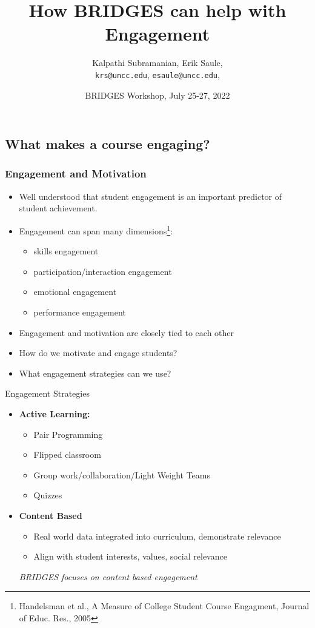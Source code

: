 \documentclass[aspectratio=169]{beamer}
\title{How BRIDGES can help with Engagement}
\subtitle{}
\author{Kalpathi Subramanian, Erik Saule, \\\texttt{krs@uncc.edu}, \texttt{esaule@uncc.edu}, }
\institute{$^1$The University of North Carolina at Charlotte}
\date{BRIDGES Workshop, July 25-27, 2022}
\begin{document}
\begin{frame}
\titlepage
\end{frame}




\subsection{What makes a course engaging?}

\begin{frame}
	\frametitle{Engagement and Motivation}
\begin{itemize} 
	\item Well understood that student engagement is an important
		predictor of student achievement.
	\item Engagement can span many dimensions\footnote{Handelsman et al., 
	A Measure of College Student Course Engagment, Journal of Educ. Res., 2005}: 
		\begin{itemize}
			\item skills engagement
			\item participation/interaction engagement
			\item emotional engagement
			\item performance engagement
		\end{itemize}
	\item Engagement and motivation are closely tied to each other
	\item How do we motivate and engage students? 
	\item What engagement  strategies  can we use? 
\end{itemize}
\end{frame}
\begin{frame}{Engagement Strategies}
\begin{itemize}
	\item \textbf{Active Learning:}
	\begin{itemize}
		\item Pair Programming
		\item Flipped classroom
		\item Group work/collaboration/Light Weight Teams
		\item Quizzes
	\end{itemize}
	\item \textbf{Content Based}
	\begin{itemize}
		\item Real world data integrated into  curriculum, demonstrate
			relevance
		\item Align with student interests, values, social relevance
	\end{itemize}
\vspace*{0.2in}
\textsl{\large BRIDGES focuses on content based engagement}
\end{itemize}
\end{frame}
\end{document}
